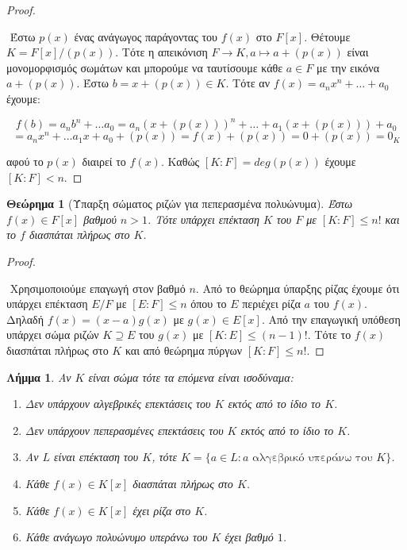 \documentclass[oneside,a4paper]{article}
\newtheorem{theorem}{Θεώρημα}
\newtheorem{lemma}{Λήμμα}
\begin{document}
\begin{proof} $ $

	$ $\newline
	Έστω $p(x)$ ένας ανάγωγος παράγοντας του $f(x)$ στο $F[x]$. Θέτουμε $K = F[x]/(p(x))$. Τότε η απεικόνιση $F\rightarrow K , a\mapsto a+ (p(x))$ είναι μονομορφισμός σωμάτων και μπορούμε να ταυτίσουμε κάθε $a \in F$ με την εικόνα $a + (p(x))$. Έστω $b = x+ (p(x)) \in K$. Τότε αν $f(x) = a_n x^n + \ldots + a_0$ έχουμε:

	$$f(b) = a_n b^n + \ldots a_0 = a_n (x + (p(x)))^n + \ldots + a_1 (x+(p(x))) + a_0 $$
	$$= a_n x^n + \ldots a_1 x + a_0 + (p(x)) = f(x) + (p(x)) = 0 + (p(x)) = 0_K$$
	
	αφού το $p(x)$ διαιρεί το $f(x)$. Καθώς $[K:F] = deg(p(x))$ έχουμε $[K:F] < n$.
\end{proof}
\vspace{0.1cm}
\begin{theorem}[Ύπαρξη σώματος ριζών για πεπερασμένα πολυώνυμα] Έστω $f(x) \in F[x]$ βαθμού $n>1$. Τότε υπάρχει επέκταση $K$ του $F$ με $[K:F]\leq n!$ και το $f$ διασπάται πλήρως στο $K$.
\end{theorem}

\begin{proof} $ $
	
	$ $\newline
	Χρησιμοποιούμε επαγωγή στον βαθμό $n$. Από το θεώρημα ύπαρξης ρίζας έχουμε ότι υπάρχει επέκταση $E/F$ με $[E:F]\leq n$ όπου το $E$ περιέχει ρίζα $a$ του $f(x)$. Δηλαδή $f(x) = (x-a) g(x)$ με $g(x) \in E[x]$. Από την επαγωγική υπόθεση υπάρχει σώμα ριζών $K\supseteq E$ του $g(x)$ με $[K:E] \leq (n-1)!$. Τότε το $f(x)$ διασπάται πλήρως στο $K$ και από θεώρημα πύργων $[K:F] \leq n!$.
\end{proof}
\vspace{0.1cm}
\begin{lemma} 
	\label{tria deka}
	Αν $K$ είναι σώμα τότε τα επόμενα είναι ισοδύναμα:
	\begin{enumerate}
		\item Δεν υπάρχουν αλγεβρικές επεκτάσεις του $K$ εκτός από το ίδιο το $K$.
		\item Δεν υπάρχουν πεπερασμένες επεκτάσεις του $K$ εκτός από το ίδιο το $K$.
		\item Αν $L$ είναι επέκταση του $K$, τότε $K = \{a \in L: a \text{ αλγεβρικό υπεράνω του } K \}$.
		\item Κάθε $f(x) \in K[x]$ διασπάται πλήρως στο $K$.
		\item Κάθε $f(x) \in K[x]$ έχει ρίζα στο $K$. 
		\item Κάθε ανάγωγο πολυώνυμο υπεράνω του $K$ έχει βαθμό $1$.
	\end{enumerate}
\end{lemma}
\end{document}

